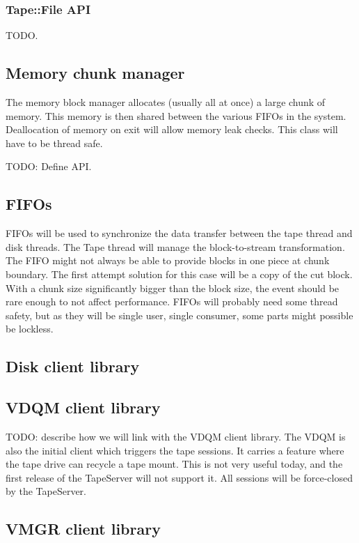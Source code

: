 \subsubsection{Tape::File API}
TODO.

\subsection{Memory chunk manager}

The memory block manager allocates (usually all at once) a large chunk of memory.
This memory is then shared between the various FIFOs in the system. Deallocation
of memory on exit will allow memory leak checks. This class will have to be 
thread safe.

TODO: Define API.

\subsection{FIFOs}

FIFOs will be used to synchronize the data transfer between the tape thread and 
disk threads. The Tape thread will manage the block-to-stream transformation. The
FIFO might not always be able to provide blocks in one piece at chunk boundary.
The first attempt solution for this case will be a copy of the cut block. With
a chunk size significantly bigger than the block size, the event should be rare
enough to not affect performance. FIFOs will probably need some thread safety,
but as they will be single user, single consumer, some parts might possible 
be lockless.

\subsection{Disk client library}

\subsection{VDQM client library}

TODO: describe how we will link with the VDQM client library. The VDQM is also 
the initial client which triggers the tape sessions. It carries a feature
where the tape drive can recycle a tape mount. This is not very useful today,
and the first release of the TapeServer will not support it. All sessions
will be force-closed by the TapeServer.

\subsection{VMGR client library}

